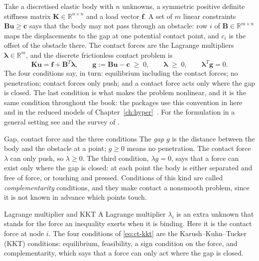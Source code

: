 Take a discretised elastic body with $n$ unknowns, a symmetric positive definite stiffness matrix $\bm K\in\mathbb R^{n\times n}$ and a load vector $\bm f$. A set of $m$ linear constraints $\bm B\bm u\ge\bm c$ says that the body may not pass through an obstacle: row $i$ of $\bm B\in\mathbb R^{m\times n}$ maps the displacements to the gap at one potential contact point, and $c_i$ is the offset of the obstacle there. The contact forces are the Lagrange multipliers $\bm\lambda\in\mathbb R^m$, and the discrete frictionless contact problem is
\begin{equation}\label{eq:ct-kkt}
\bm K\bm u=\bm f+\bm B^{T}\bm\lambda,\qquad
\bm g:=\bm B\bm u-\bm c\;\ge\;0,\qquad
\bm\lambda\;\ge\;0,\qquad
\bm\lambda^{T}\bm g=0 .
\end{equation}
The four conditions say, in turn: equilibrium including the contact forces; no penetration; contact forces only push; and a contact force acts only where the gap is closed. The last condition is what makes the problem nonlinear, and it is the same condition throughout the book: the packages use this convention in \fea{} here and in the reduced models of Chapter~\ref{ch:hyper}~\cite{balajewicz2016contact}. For the formulation in a general setting see \citet{wriggers2006contact} and the survey of \citet{wohlmuth2011contact}.

\begin{sidenote}{Gap, contact force and the three conditions}
The \emph{gap} $g$ is the distance between the body and the obstacle at a point; $g\ge0$ means no penetration. The contact force $\lambda$ can only push, so $\lambda\ge0$. The third condition, $\lambda g=0$, says that a force can exist only where the gap is closed: at each point the body is either separated and free of force, or touching and pressed. Conditions of this kind are called \emph{complementarity} conditions, and they make contact a nonsmooth problem, since it is not known in advance which points touch.
\end{sidenote}

\begin{sidenote}{Lagrange multiplier and KKT}
A Lagrange multiplier $\lambda_i$ is an extra unknown that stands for the force an inequality exerts when it is binding. Here it is the contact force at node $i$. The four conditions of \eqref{eq:ct-kkt} are the Karush--Kuhn--Tucker (KKT) conditions: equilibrium, feasibility, a sign condition on the force, and complementarity, which says that a force can only act where the gap is closed.
\end{sidenote}

